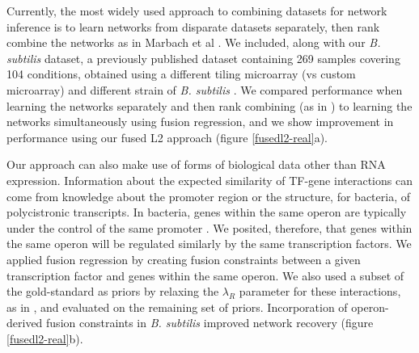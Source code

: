 \documentclass[11pt]{article}
\begin{document}
Currently, the most widely used approach to combining datasets for network inference is to learn networks from disparate datasets separately, then rank combine the networks as in Marbach et al \cite{marbach_revealing_2010}.
We included, along with our \textit{B. subtilis} dataset, a previously published dataset containing 269 samples covering 104 conditions, obtained using a different tiling microarray (vs custom microarray) and different strain of \textit{B. subtilis} \cite{nicolas2012condition}. 
We compared performance when learning the networks separately and then rank combining (as in \cite{ciofani_validated_2012}) to learning the networks simultaneously using fusion regression, and we show improvement in performance using our fused L2 approach (figure \ref{fusedl2-real}a). 

Our approach can also make use of forms of biological data other than RNA expression. Information about the expected similarity of TF-gene interactions can come from knowledge about the promoter region or the structure, for bacteria, of polycistronic transcripts. In bacteria, genes within the same operon are typically under the control of the same promoter \cite{lawrence_shared_2002}. We posited, therefore, that genes within the same operon will be regulated similarly by the same transcription factors. We applied fusion regression by creating fusion constraints between a given transcription factor and genes within the same operon. We also used a subset of the gold-standard as priors by relaxing the $\lambda_R$ parameter for these interactions, as in \cite{greenfield_robust_2013}, and evaluated on the remaining set of priors. Incorporation of operon-derived fusion constraints in \textit{B. subtilis} improved network recovery (figure \ref{fusedl2-real}b). 
\end{document}
